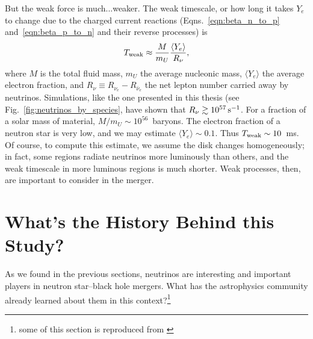 But the weak force is much...weaker.
The weak timescale, or how long it takes $Y_e$ to change due to the charged
current reactions (Eqns.~\ref{eqn:beta_n_to_p} and~\ref{eqn:beta_p_to_n} and
their reverse processes) is
\begin{equation}
  T_{\rm weak} \approx \frac{M}{m_U} \frac{\langle Y_e \rangle}{R_\nu},
\end{equation}
where $M$ is the total fluid mass, $m_U$ the average nucleonic mass,
$\langle Y_e \rangle$ the average electron fraction, and
$R_\nu \equiv R_{\nu_e}-R_{\bar{\nu}_e}$ the net lepton number carried
away by neutrinos.
Simulations, like the one presented in this thesis (see
Fig.~\ref{fig:neutrinos_by_species}, have shown that
$R_\nu\gtrsim10^{57}\,{\rm s}^{-1}$.
For a fraction of a solar mass of material, $M/m_U\sim10^{56}$~baryons.
The electron fraction of a neutron star is very low, and we may estimate
$\langle Y_e \rangle\sim0.1$. Thus $T_{\rm weak}\sim10$~ms. Of course, to
compute this estimate, we assume the disk changes homogeneously; in fact,
some regions radiate neutrinos more luminously than others, and the weak
timescale in more luminous regions is much shorter.
Weak processes, then, are important to consider in the merger.


\section{What's the History Behind this Study?}
\label{sec:history}
As we found in the previous sections, neutrinos are interesting and important
players in neutron star--black hole mergers.
What has the astrophysics community already learned about them
in this context?\footnote{
some of this section is reproduced from \citealt[Sec.~1]{deat2013-leakage}}


